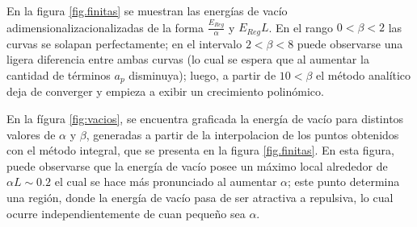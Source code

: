En la figura \ref{fig.finitas} se muestran las energías de vacío adimensionalizacionalizadas de la forma $\frac{E _{Reg}}{\alpha}$ y $E _{Reg} L$. En el rango $0 < \beta < 2$ las curvas se solapan perfectamente; en el intervalo $2 < \beta < 8$ puede observarse una ligera diferencia entre ambas curvas (lo cual se espera que al aumentar la cantidad de términos $a _p$ disminuya); luego, a partir de $10 < \beta$ el método analítico  deja de converger y empieza a exibir un crecimiento polinómico.

En la fígura \ref{fig:vacios}, se encuentra graficada la energía de vacío para distintos valores de $\alpha$ y $\beta$, generadas a partir de la interpolacion de los puntos obtenidos con el método integral, que se presenta en la figura \ref{fig.finitas}. En esta figura, puede observarse que la energía de vacío posee un máximo local alrededor de $\alpha L \sim 0.2$ el cual se hace más pronunciado al aumentar $\alpha$; este punto determina una región, donde la energía de vacío pasa de ser atractiva a repulsiva, lo cual ocurre independientemente de cuan pequeño sea $\alpha$.

